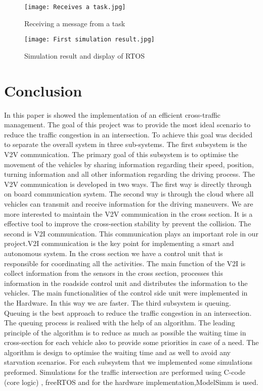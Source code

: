 \documentclass[conference]{IEEEtran}
\begin{document}
\begin{itemize}
\begin{figure}[htp]
    \centering
    \texttt{[image: Receives a task.jpg]}
    \caption{Receiving a message from a task}
    \label{fig:reg-gen}
\end{figure}

\begin{figure}[htp]
    \centering
    \texttt{[image: First simulation result.jpg]}
    \caption{Simulation result and display of RTOS}
    \label{fig:reg-gen}
\end{figure}

  


\end{itemize}


\section{Conclusion}

In this paper is showed the implementation of an efficient cross-traffic management. The goal of this project was to provide the most ideal scenario to reduce the traffic congestion in an intersection. To achieve this goal was decided to separate the overall system in three sub-systems. The first subsystem is the V2V communication. The primary goal of this subsystem is to optimise the movement of the vehicles by sharing information regarding their speed, position, turning information and all other information regarding the driving process. The V2V communication is developed in  two ways. The first way is directly through on board communication system. The second way is through the cloud where all vehicles can transmit and receive information for the driving maneuvers. We are more interested to maintain the V2V communication in the cross section. It is a effective tool to improve the cross-section stability by prevent the collision. The second is V2I communication. This communication plays an important role in our project.V2I communication is the key point for implementing a smart and autonomous system. In the cross section we have a control unit that is responsible for coordinating all the activities. The main function of the V2I is collect information from the sensors in the cross section, processes this information in the roadside control unit and distributes the information to the vehicles. The main functionalities of the control side unit were implemented in the Hardware. In this way we are faster. The third subsystem is queuing. Queuing is the best approach to reduce the traffic congestion in an intersection. The queuing process is realised with the help of an algorithm. The leading principle of the algorithm is to reduce as much as possible the waiting time in cross-section for each vehicle also to provide some priorities in case of a need. The algorithm is design to optimise the waiting time and as well to avoid any starvation scenarios. For each subsystem that we implemented some simulations preformed. Simulations for the traffic intersection are performed using C-code (core logic) , freeRTOS and for the hardware implementation,ModelSimm is used. 
\newline 
\end{document}
